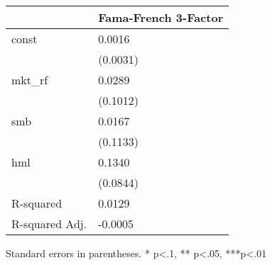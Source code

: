 \begin{table}
\caption{}
\label{}
\begin{center}
\begin{tabular}{ll}
\hline
               & Fama-French 3-Factor  \\
\hline
const          & 0.0016                \\
               & (0.0031)              \\
mkt\_rf        & 0.0289                \\
               & (0.1012)              \\
smb            & 0.0167                \\
               & (0.1133)              \\
hml            & 0.1340                \\
               & (0.0844)              \\
R-squared      & 0.0129                \\
R-squared Adj. & -0.0005               \\
\hline
\end{tabular}
\end{center}
\end{table}
\bigskip
Standard errors in parentheses. \newline 
* p<.1, ** p<.05, ***p<.01